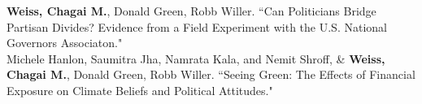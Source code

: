 \documentclass[11pt]{article}
\begin{document}
\textbf{Weiss, Chagai M.}, Donald Green, Robb Willer. ``Can Politicians Bridge Partisan Divides? Evidence from a Field Experiment with the U.S. National Governors Associaton."\\

Michele Hanlon, Saumitra Jha, Namrata Kala, and Nemit Shroff, \& \textbf{Weiss, Chagai M.}, Donald Green, Robb Willer. ``Seeing Green: The Effects of Financial Exposure on Climate Beliefs and Political Attitudes."






 

               

 
     
                       

\end{document}
